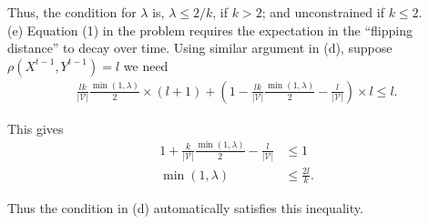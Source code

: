 \documentclass{article}
\newcommand{\qeds}{\hfill\qedsymbol}
\begin{document}
Thus, the condition for $\lambda$ is, $\lambda \leq 2/k$, if $k > 2$; and unconstrained if $ k \leq 2$.
\\

\noindent
(e) Equation (1) in the problem requires the expectation in the ``flipping distance'' to decay 
over time. Using similar argument in (d), suppose $\rho(X^{t-1}, Y^{t-1}) = l$ we need
\begin{align*}
	\frac{lk}{|\mathscr{V}|}\frac{\min(1, \lambda)}{2}\times(l+1) +(1 - \frac{lk}{|\mathscr{V}|}\frac{\min(1, \lambda)}{2} - \frac{l}{|\mathscr{V}|})\times l \leq l.
\end{align*}

This gives
\begin{align*}
	1 + \frac{k}{|\mathscr{V}|}\frac{\min(1, \lambda)}{2} - \frac{l}{|\mathscr{V}|} &\leq 1 \\
	\min(1, \lambda) &\leq \frac{2l}{k}.
\end{align*}

Thus the condition in (d) automatically satisfies this inequality. \qeds
\end{document}
